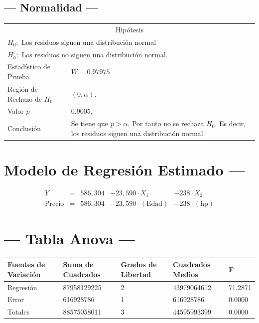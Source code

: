 \documentclass{article}
\begin{document}
\subsection{--- Normalidad ---} %
\begin{center}
  \begin{tabular}{|l|p{8cm}|}
    \cline{1-2}
    \multicolumn{2}{|c|}{Hipótesis}\\ \cline{1-2}
    \multicolumn{2}{|l|}{\(H_0:\) Los residuos siguen una distribución normal} \\ 
    \multicolumn{2}{|l|}{\(H_a:\) Los residuos no siguen una distribución normal.} \\ \cline{1-2}
    Estadístico de Prueba & \(W = 0.97975\).\\ \cline{1-2} 
		Región de Rechazo de \(H_0\) & \((0, \alpha )\).\\ \cline{1-2} 
    Valor \(p\) & \(0.9005\).\\ \cline{1-2} 
    Conclusión & Se tiene que \(p> \alpha\). \newline 
		Por tanto no se rechaza \(H_0\). \newline 
		Es decir, los residuos siguen una distribución normal.\\ \cline{1-2} 
  \end{tabular}
\end{center}


\newpage

\section{\centering Modelo de Regresión Estimado ---} %
\begin{align}
	Y & = &              586,304 & - 23,590 \cdot X_1           & - 238     \cdot X_2   \\[2mm]
	\mbox{Precio} & = &  586,304 & - 23,590 \cdot (\mbox{Edad}) & - 238     \cdot (\mbox{hp})
	\label{eq:1}
\end{align}

\section{\centering --- Tabla Anova ---} %
\begin{center}
  \begin{tabular}{|l|l|l|l|l|}
    \hline 
    Fuentes de Variación  & Suma de Cuadrados & Grados de Libertad & Cuadrados Medios & F\\ \hline 
Regresión  &  87958129225          &  2      & 43979064612 & 71.2871\\ \hline
Error      &    616928786          &  1      &   616928786 &  0.0000\\ \hline
Totales    &  88575058011          &  3      & 44595993399 &  0.0000\\ \hline
  \end{tabular}
\end{center} 
\end{document}
